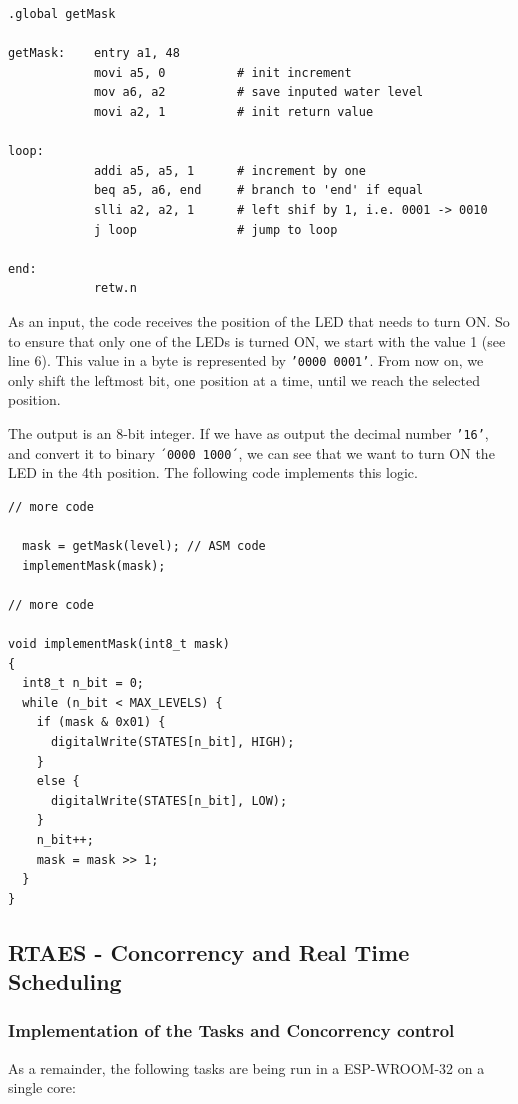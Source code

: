 \documentclass[11pt]{article}
\begin{document}
\begin{verbatim}
.global getMask

getMask:    entry a1, 48
            movi a5, 0          # init increment
            mov a6, a2          # save inputed water level
            movi a2, 1          # init return value

loop: 
            addi a5, a5, 1      # increment by one
            beq a5, a6, end     # branch to 'end' if equal
            slli a2, a2, 1      # left shif by 1, i.e. 0001 -> 0010
            j loop              # jump to loop 

end:
            retw.n
\end{verbatim}

As an input, the code receives the position of the LED that needs to turn ON. So to ensure that only one of the LEDs is turned ON, we start with the value 1 (see line 6). This value in a byte is represented by \texttt{'0000 0001'}. From now on, we only shift the leftmost bit, one position at a time, until we reach the selected position.

The output is an 8-bit integer. If we have as output the decimal number \texttt{'16'}, and convert it to binary \texttt{´0000 1000´}, we can see that we want to turn ON the LED in the 4th position. The following code implements this logic. 

\begin{verbatim}
// more code

  mask = getMask(level); // ASM code
  implementMask(mask);

// more code

void implementMask(int8_t mask)
{
  int8_t n_bit = 0;
  while (n_bit < MAX_LEVELS) {
    if (mask & 0x01) {
      digitalWrite(STATES[n_bit], HIGH);
    }
    else {
      digitalWrite(STATES[n_bit], LOW);
    }
    n_bit++;
    mask = mask >> 1;
  }
}
\end{verbatim}


\subsection{RTAES - Concorrency and Real Time Scheduling}

\subsubsection{Implementation of the Tasks and Concorrency control}

As a remainder, the following tasks are being run in a ESP-WROOM-32 on a single core:
\end{document}
